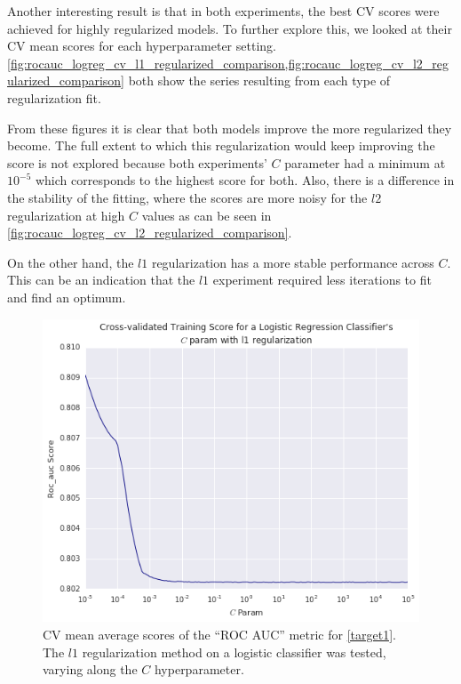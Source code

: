 Another interesting result is that in both experiments, the best CV scores were achieved for highly regularized models.
To further explore this, we looked at their CV mean scores for each hyperparameter setting.
\cref{fig:rocauc_logreg_cv_l1_regularized_comparison,fig:rocauc_logreg_cv_l2_regularized_comparison} both show the series resulting from each type of regularization fit.

 From these figures it is clear that both models improve the more regularized they become.
 The full extent to which this regularization would keep improving the score is not explored because both experiments' $C$ parameter had a minimum at $10^{-5}$ which corresponds to the highest score for both.
 Also, there is a difference in the stability of the fitting, where the scores are more noisy for the $l2$ regularization at high $C$ values as can be seen in \cref{fig:rocauc_logreg_cv_l2_regularized_comparison}.

 On the other hand, the $l1$ regularization has a more stable performance across $C$.
 This can be an indication that the $l1$ experiment required less iterations to fit and find an optimum.

\begin{figure}[h!]
	\begin{center}
		\includegraphics[width=1\linewidth]{figures/cross_validation/logreg_cv_regularization_l1_rocauc_series}
		\caption{CV mean average scores of the ``ROC AUC'' metric for \cref{target1}. The $l1$ regularization method on a logistic classifier was tested, varying along the $C$ hyperparameter.}
		\label{fig:rocauc_logreg_cv_l1_regularized_comparison}
	\end{center}
\end{figure}



